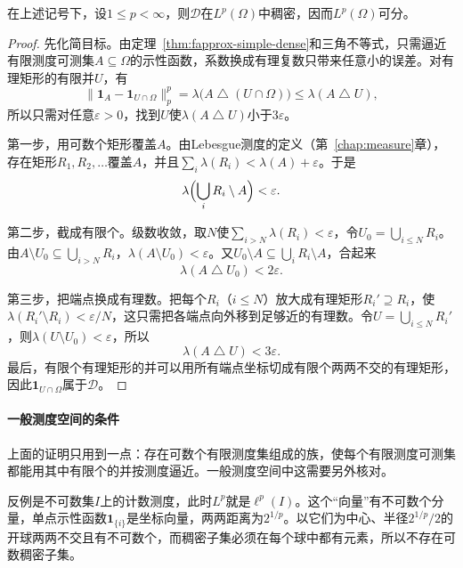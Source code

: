 \begin{theorem}
\label{thm:fapprox-separable}
在上述记号下，设$1\leq p<\infty$，则$\mathcal D$在$L^p(\Omega)$中稠密，因而$L^p(\Omega)$可分。
\end{theorem}

\begin{proof}
先化简目标。由定理~\ref{thm:fapprox-simple-dense}和三角不等式，只需逼近有限测度可测集$A\subseteq\Omega$的示性函数，系数换成有理复数只带来任意小的误差。对有理矩形的有限并$U$，有
\[
 \lVert\mathbf 1_A-\mathbf 1_{U\cap\Omega}\rVert_p^p=\lambda\bigl(A\mathbin{\triangle}(U\cap\Omega)\bigr)\leq\lambda(A\mathbin{\triangle}U),
\]
所以只需对任意$\varepsilon>0$，找到$U$使$\lambda(A\mathbin{\triangle}U)$小于$3\varepsilon$。

第一步，用可数个矩形覆盖$A$。由Lebesgue测度的定义（第~\ref{chap:measure}章），存在矩形$R_1,R_2,\ldots$覆盖$A$，并且$\sum_i\lambda(R_i)<\lambda(A)+\varepsilon$。于是
\[
 \lambda\Bigl(\bigcup_iR_i\setminus A\Bigr)<\varepsilon .
\]

第二步，截成有限个。级数收敛，取$N$使$\sum_{i>N}\lambda(R_i)<\varepsilon$，令$U_0=\bigcup_{i\leq N}R_i$。由$A\setminus U_0\subseteq\bigcup_{i>N}R_i$，$\lambda(A\setminus U_0)<\varepsilon$。又$U_0\setminus A\subseteq\bigcup_iR_i\setminus A$，合起来
\[
 \lambda(A\mathbin{\triangle}U_0)<2\varepsilon .
\]

第三步，把端点换成有理数。把每个$R_i$（$i\leq N$）放大成有理矩形$R_i'\supseteq R_i$，使$\lambda(R_i'\setminus R_i)<\varepsilon/N$，这只需把各端点向外移到足够近的有理数。令$U=\bigcup_{i\leq N}R_i'$，则$\lambda(U\setminus U_0)<\varepsilon$，所以
\[
 \lambda(A\mathbin{\triangle}U)<3\varepsilon .
\]
最后，有限个有理矩形的并可以用所有端点坐标切成有限个两两不交的有理矩形，因此$\mathbf 1_{U\cap\Omega}$属于$\mathcal D$。
\end{proof}

\paragraph{一般测度空间的条件}
上面的证明只用到一点：存在可数个有限测度集组成的族，使每个有限测度可测集都能用其中有限个的并按测度逼近。一般测度空间中这需要另外核对。

反例是不可数集$I$上的计数测度，此时$L^p$就是$\ell^p(I)$。这个“向量”有不可数个分量，单点示性函数$\mathbf 1_{\{i\}}$是坐标向量，两两距离为$2^{1/p}$。以它们为中心、半径$2^{1/p}/2$的开球两两不交且有不可数个，而稠密子集必须在每个球中都有元素，所以不存在可数稠密子集。

